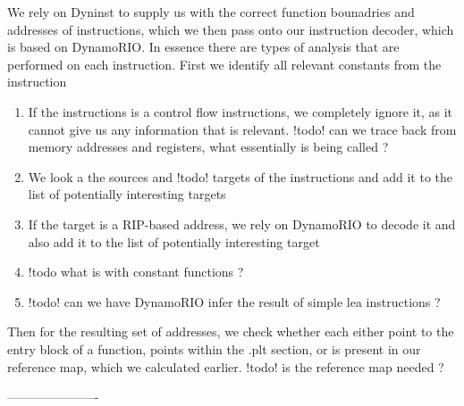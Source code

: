 We rely on Dyninst \cite{dyninst00} to supply us with the correct function bounadries and addresses of instructions, which we then pass onto our instruction decoder, which is based on DynamoRIO. In essence there are types of analysis that are performed on each instruction. First we identify all relevant constants from the instruction
\begin{enumerate}
\item If the instructions is a control flow instructions, we completely ignore it, as it cannot give us any information that is relevant. {!todo! can we trace back from memory addresses and registers, what essentially is being called ?}
\item We look a the sources and {!todo! targets} of the instructions and add it to the list of potentially interesting targets
\item If the target is a RIP-based address, we rely on DynamoRIO to decode it and also add it to the list of potentially interesting target

\item {!todo what is with constant functions ?}
\item {!todo! can we have DynamoRIO infer the result of simple lea instructions ?}
\end{enumerate}

Then for the resulting set of addresses, we check whether each either point to the entry block of a function, points within the .plt section, or is present in our reference map, which we calculated earlier. {!todo! is the reference map needed ?}

----------------------